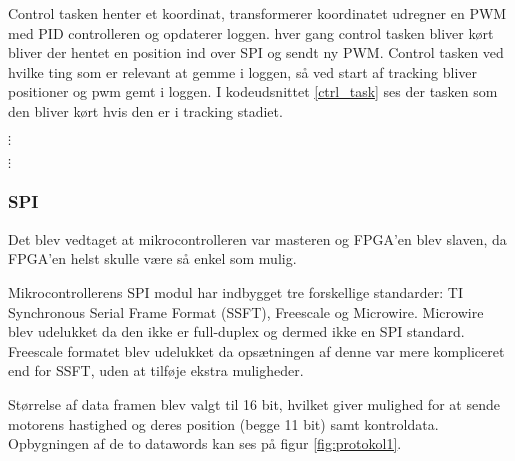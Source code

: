 Control tasken henter et koordinat, transformerer koordinatet udregner en PWM med PID controlleren og opdaterer loggen.
hver gang control tasken bliver kørt bliver der hentet en position ind over SPI og sendt ny PWM. 
Control tasken ved hvilke ting som er relevant at gemme i loggen, så ved start af tracking bliver positioner og pwm gemt i loggen.
I kodeudsnittet \ref{ctrl_task} ses der tasken som den bliver kørt hvis den er i tracking stadiet.


\(\vdots\)

\(\vdots\)

        
\subsubsection{SPI}
\label{sec:spi-implementering}
Det blev vedtaget at mikrocontrolleren var masteren og FPGA'en blev slaven, da FPGA'en helst skulle være så enkel som mulig.

Mikrocontrollerens SPI modul har indbygget tre forskellige standarder: TI Synchronous Serial Frame Format (SSFT), Freescale og Microwire. 
Microwire blev udelukket da den ikke er full-duplex og dermed ikke en SPI standard. 
Freescale formatet blev udelukket da opsætningen af denne var mere kompliceret end for SSFT, uden at tilføje ekstra muligheder.

Størrelse af data framen blev valgt til 16 bit, hvilket giver mulighed for at sende motorens hastighed og deres position (begge 11 bit) samt kontroldata. Opbygningen af de to datawords kan ses på figur \ref{fig:protokol1}.

